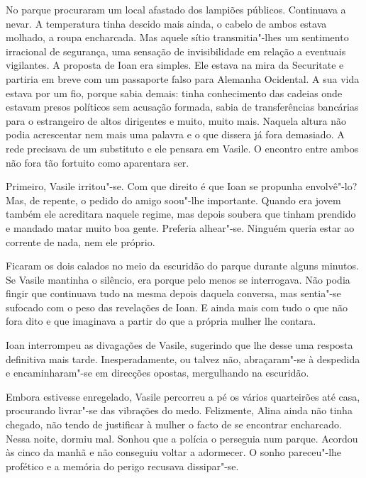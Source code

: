No parque procuraram um local afastado dos lampiões públicos. Continuava
a nevar. A temperatura tinha descido mais ainda, o cabelo de ambos
estava molhado, a roupa encharcada. Mas aquele sítio transmitia"-lhes um
sentimento irracional de segurança, uma sensação de invisibilidade
em relação a eventuais vigilantes. A proposta de Ioan era simples. Ele
estava na mira da Securitate e partiria em breve com um passaporte falso
para Alemanha Ocidental. A sua vida estava por um fio, porque sabia
demais: tinha conhecimento das cadeias onde estavam presos políticos sem
acusação formada, sabia de transferências bancárias para o estrangeiro
de altos dirigentes e muito, muito mais. Naquela altura não podia
acrescentar nem mais uma palavra e o que dissera já fora demasiado. A
rede precisava de um substituto e ele pensara em Vasile. O encontro
entre ambos não fora tão fortuito como aparentara ser.

\bigskip

Primeiro, Vasile irritou"-se. Com que direito é que Ioan se propunha
envolvê"-lo? Mas, de repente, o pedido do amigo soou"-lhe importante.
Quando era jovem também ele acreditara naquele regime, mas depois
soubera que tinham prendido e mandado matar muito boa gente. Preferia
alhear"-se. Ninguém queria estar ao corrente de nada, nem ele próprio.

Ficaram os dois calados no meio da escuridão do parque durante alguns
minutos. Se Vasile mantinha o silêncio, era porque pelo menos se
interrogava. Não podia fingir
que continuava tudo na mesma depois daquela conversa, mas sentia"-se
sufocado com o peso das revelações de Ioan. E ainda mais com tudo o que
não fora dito e que imaginava a partir do que a própria mulher lhe
contara.

Ioan interrompeu as divagações de Vasile, sugerindo que lhe desse uma
resposta definitiva mais tarde. Inesperadamente, ou talvez não,
abraçaram"-se à despedida e encaminharam"-se em direcções opostas,
mergulhando na escuridão.

Embora estivesse enregelado, Vasile percorreu a pé os vários quarteirões
até casa, procurando livrar"-se das vibrações do medo. Felizmente,
Alina ainda não tinha chegado, não tendo de justificar à mulher o facto
de se encontrar encharcado. Nessa noite, dormiu mal. Sonhou que a polícia o perseguia num parque. Acordou às cinco da manhã e não conseguiu
voltar a adormecer. O sonho pareceu"-lhe profético e a memória do perigo
recusava dissipar"-se.

